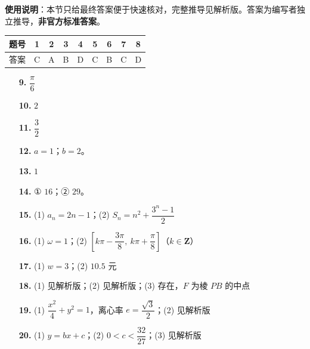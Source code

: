 
\begin{gknotice}
\textbf{使用说明}：本节只给最终答案便于快速核对，完整推导见解析版。答案为编写者独立推导，\textbf{非官方标准答案}。
\end{gknotice}

\begin{center}\begin{tabular}{ccccccccc}
\toprule
题号 & 1 & 2 & 3 & 4 & 5 & 6 & 7 & 8 \\
\midrule
答案 & C & A & B & D & C & B & C & D \\
\bottomrule
\end{tabular}\end{center}

\begin{itemize}[leftmargin=2.6em]
  \item[\textbf{9.}] \(\dfrac{\pi}{6}\)
  \item[\textbf{10.}] \(2\)
  \item[\textbf{11.}] \(\dfrac{3}{2}\)
  \item[\textbf{12.}] \(a=1\)；\(b=2\)。
  \item[\textbf{13.}] \(1\)
  \item[\textbf{14.}] ① \(16\)；② \(29\)。
\end{itemize}

\begin{itemize}[leftmargin=2.6em]
  \item[\textbf{15.}] (1) \(a_n=2n-1\)；(2) \(S_n=n^{2}+\dfrac{3^{n}-1}{2}\)
  \item[\textbf{16.}] (1) \(\omega=1\)；(2) \(\left[k\pi-\dfrac{3\pi}{8},\ k\pi+\dfrac{\pi}{8}\right]\)（\(k\in\mathbf{Z}\)）
  \item[\textbf{17.}] (1) \(w=3\)；(2) \(10.5\) 元
  \item[\textbf{18.}] (1) 见解析版；(2) 见解析版；(3) 存在，\(F\) 为棱 \(PB\) 的中点
  \item[\textbf{19.}] (1) \(\dfrac{x^{2}}{4}+y^{2}=1\)，离心率 \(e=\dfrac{\sqrt{3}}{2}\)；(2) 见解析版
  \item[\textbf{20.}] (1) \(y=bx+c\)；(2) \(0<c<\dfrac{32}{27}\)；(3) 见解析版
\end{itemize}

